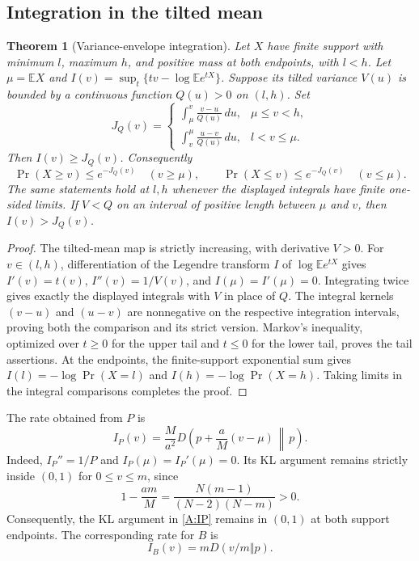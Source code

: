 \documentclass[11pt,a4paper]{article}
\newtheorem{theorem}{Theorem}[section]
\newcommand{\E}{\mathbb E}\newcommand{\R}{\mathbb R}\newcommand{\N}{\mathbb N}\newcommand{\one}{\mathbf1}
\begin{document}
\subsection{Integration in the tilted mean}
\begin{theorem}[Variance-envelope integration]\label{A:integration}
Let $X$ have finite support with minimum $l$, maximum $h$, and positive
mass at both endpoints, with $l<h$. Let $\mu=\E X$ and
$I(v)=\sup_t\{tv-\log\E e^{tX}\}$.
Suppose its tilted variance $V(u)$ is bounded by a continuous function
$Q(u)>0$ on $(l,h)$. Set
\[
 J_Q(v)=
 \begin{cases}
 \displaystyle\int_\mu^v\frac{v-u}{Q(u)}\,du,&\mu\le v<h,\\[5pt]
 \displaystyle\int_v^\mu\frac{u-v}{Q(u)}\,du,&l<v\le\mu.
 \end{cases}
\]
Then $I(v)\ge J_Q(v)$. Consequently
\[
 \Pr(X\ge v)\le e^{-J_Q(v)}\quad(v\ge\mu),\qquad
 \Pr(X\le v)\le e^{-J_Q(v)}\quad(v\le\mu).
\]
The same statements hold at $l,h$ whenever the displayed integrals have
finite one-sided limits. If $V<Q$ on an interval of positive length between
$\mu$ and $v$, then $I(v)>J_Q(v)$.
\end{theorem}
\begin{proof}
The tilted-mean map is strictly increasing, with derivative $V>0$.
For $v\in(l,h)$, differentiation of the Legendre transform $I$ of $\log\E e^{tX}$ gives
$I'(v)=t(v)$, $I''(v)=1/V(v)$, and $I(\mu)=I'(\mu)=0$.
Integrating twice gives exactly the displayed integrals with $V$ in place
of $Q$. The integral kernels $(v-u)$ and $(u-v)$ are nonnegative on the respective integration
intervals, proving both the comparison and its strict version.
Markov's inequality, optimized over $t\ge0$ for the upper tail and
$t\le0$ for the lower tail, proves the tail assertions.
At the endpoints, the finite-support exponential sum gives
$I(l)=-\log\Pr(X=l)$ and $I(h)=-\log\Pr(X=h)$.
Taking limits in the integral comparisons completes the proof.
\end{proof}

The rate obtained from $P$ is
\begin{equation}\label{A:IP}
 I_P(v)=\frac M{a^2}D\left(p+\frac aM(v-\mu)\,\middle\Vert\,p\right).
\end{equation}
Indeed, $I_P''=1/P$ and $I_P(\mu)=I_P'(\mu)=0$.
Its KL argument remains strictly inside $(0,1)$ for $0\le v\le m$, since
\[
 1-\frac{am}{M}
 =\frac{N(m-1)}{(N-2)(N-m)}>0.
\]
Consequently, the KL argument in \eqref{A:IP} remains in $(0,1)$ at both support endpoints. The corresponding rate for $B$ is
\begin{equation}\label{A:IB}
 I_B(v)=mD(v/m\Vert p).
\end{equation}
\end{document}
